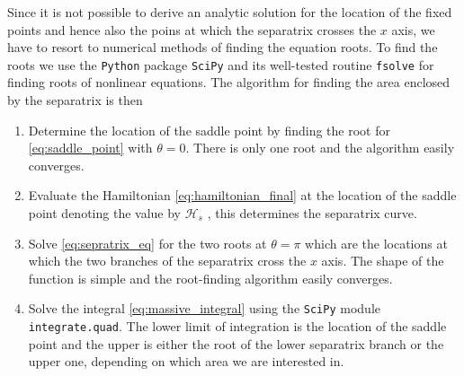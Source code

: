 \documentclass[ twoside,openright,titlepage,numbers=noenddot,headinclude,%
                footinclude=true,cleardoublepage=empty,abstractoff, %
                BCOR=5mm,paper=a4,fontsize=11pt,%
                american,%
                ]{scrreprt}
\begin{document}
Since it is not possible to derive an analytic solution for the location
of the fixed points and hence also the poins at which the separatrix
crosses the $x$ axis, we have to resort to numerical methods of finding
the equation roots. To find the roots we use
the \texttt{Python} package \texttt{SciPy} \citep{scipy} and its
well-tested routine \texttt{fsolve} for finding roots of nonlinear equations.
The algorithm for finding the area enclosed by the separatrix is then
\begin{enumerate}
    \item Determine the location of the saddle point by finding the root
        for \cref{eq:saddle_point} with $\theta=0$. There is only one
        root and the algorithm easily converges.
    \item Evaluate the Hamiltonian \ref{eq:hamiltonian_final} at the 
        location of the saddle point denoting the value by $\mathcal{H}_s$
        , this determines the separatrix curve.
    \item Solve \cref{eq:sepratrix_eq} for the two roots at $\theta=\pi$ 
        which are the locations at which the two branches of the separatrix 
        cross the $x$ axis. The shape of the function is simple and the
        root-finding algorithm easily converges.
    \item Solve the integral \ref{eq:massive_integral} using the \texttt{SciPy}
        module \texttt{integrate.quad}. The lower limit of integration is the
        location of the saddle point and the upper is either the root 
        of the lower separatrix branch or the upper one, depending on which
        area we are interested in.
\end{enumerate}
\end{document}

